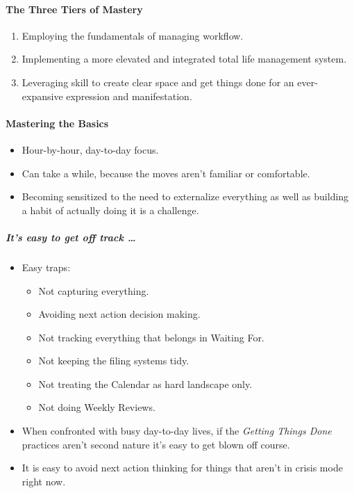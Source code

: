 \documentclass{article}
\begin{document}
\paragraph{The Three Tiers of Mastery}

\begin{enumerate}
 \item Employing the fundamentals of managing workflow.
 \item Implementing a more elevated and integrated total life management system.
 \item Leveraging skill to create clear space and get things done for an ever-expansive expression and manifestation.
\end{enumerate}

\paragraph{Mastering the Basics}

\begin{itemize}
 \item Hour-by-hour, day-to-day focus.
 \item Can take a while, because the moves aren't familiar or comfortable.
 \item Becoming sensitized to the need to externalize everything as well as building a habit of actually doing it is a challenge.
\end{itemize}

\subparagraph{It's easy to get off track \ldots}

\begin{itemize}
 \item Easy traps:
 \begin{itemize}
  \item Not capturing everything.
  \item Avoiding next action decision making.
  \item Not tracking everything that belongs in Waiting For.
  \item Not keeping the filing systems tidy.
  \item Not treating the Calendar as hard landscape only.
  \item Not doing Weekly Reviews.
 \end{itemize}
 \item When confronted with busy day-to-day lives, if the \textit{Getting Things Done} practices aren't second nature it's easy to get blown off course.
 \item It is easy to avoid next action thinking for things that aren't in crisis mode right now.
\end{itemize}
\end{document}
